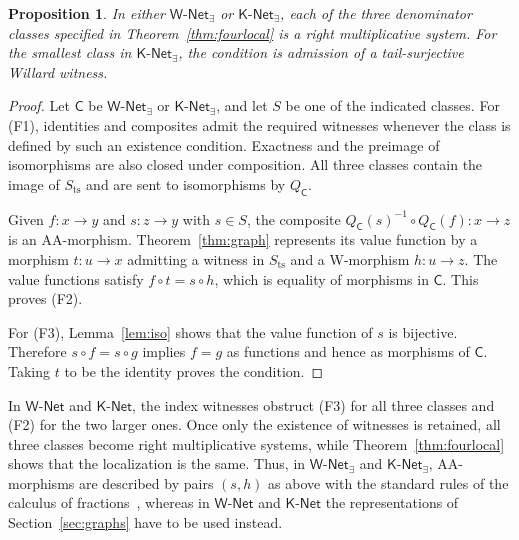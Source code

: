 \documentclass[11pt,a4paper]{article}
\newtheorem{proposition}[theorem]{Proposition}
\theoremstyle{definition}
\theoremstyle{remark}
\newcommand{\Wpar}{\mathsf{W\text{-}Net}}
\newcommand{\Kpar}{\mathsf{K\text{-}Net}}
\newcommand{\Wex}{\mathsf{W\text{-}Net}_{\exists}}
\newcommand{\Kex}{\mathsf{K\text{-}Net}_{\exists}}
\newcommand{\CC}{\mathsf C}
\newcommand{\Sts}{S_{\mathrm{ts}}}
\begin{document}
\begin{proposition}\label{prop:fractions}
In either \(\Wex\) or \(\Kex\), each of the three denominator
classes specified in Theorem~\ref{thm:fourlocal} is a right
multiplicative system. For the smallest class in \(\Kex\), the
condition is admission of a tail-surjective Willard witness.
\end{proposition}
\begin{proof}
Let \(\CC\) be \(\Wex\) or \(\Kex\), and let \(S\) be one
of the indicated classes. For (F1), identities and composites admit
the required witnesses whenever the class is defined by such an
existence condition. Exactness and the preimage of isomorphisms are
also closed under composition. All three classes contain the image
of \(\Sts\) and are sent to isomorphisms by \(Q_{\CC}\).

Given \(f:x\to y\) and \(s:z\to y\) with \(s\in S\),
the composite \(Q_{\CC}(s)^{-1}\circ Q_{\CC}(f):x\to z\)
is an AA-morphism. Theorem~\ref{thm:graph} represents its value
function by a morphism \(t:u\to x\) admitting a witness in
\(\Sts\) and a W-morphism \(h:u\to z\). The value functions
satisfy \(f\circ t=s\circ h\), which is equality of morphisms
in \(\CC\). This proves (F2).

For (F3), Lemma~\ref{lem:iso} shows that the value function of
\(s\) is bijective. Therefore \(s\circ f=s\circ g\) implies
\(f=g\) as functions and hence as morphisms of \(\CC\).
Taking \(t\) to be the identity proves the condition.
\end{proof}

In \(\Wpar\) and \(\Kpar\), the index witnesses obstruct (F3)
for all three classes and (F2) for the two larger ones. Once only the
existence of witnesses is retained, all three classes become right
multiplicative systems, while Theorem~\ref{thm:fourlocal} shows that
the localization is the same. Thus, in \(\Wex\) and \(\Kex\),
AA-morphisms are described by pairs \((s,h)\) as above with the
standard rules of the calculus of fractions~\cite[Section 4.27]{Stacks},
whereas in \(\Wpar\) and \(\Kpar\) the representations of
Section~\ref{sec:graphs} have to be used instead.
\end{document}

